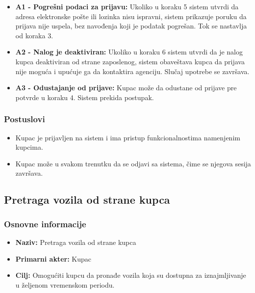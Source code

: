 \documentclass[a4paper,12pt]{article}
\begin{document}
\begin{itemize}
    \item \textbf{A1 - Pogrešni podaci za prijavu:}
    Ukoliko u koraku 5 sistem utvrdi da adresa elektronske pošte ili lozinka nisu ispravni, sistem prikazuje poruku da prijava nije uspela, bez navođenja koji je podatak pogrešan. Tok se nastavlja od koraka 3.

    \item \textbf{A2 - Nalog je deaktiviran:}
    Ukoliko u koraku 6 sistem utvrdi da je nalog kupca deaktiviran od strane zaposlenog, sistem obaveštava kupca da prijava nije moguća i upućuje ga da kontaktira agenciju. Slučaj upotrebe se završava.

    \item \textbf{A3 - Odustajanje od prijave:}
    Kupac može da odustane od prijave pre potvrde u koraku 4. Sistem prekida postupak.
\end{itemize}

\subsubsection{Postuslovi}

\begin{itemize}
    \item Kupac je prijavljen na sistem i ima pristup funkcionalnostima namenjenim kupcima.
    \item Kupac može u svakom trenutku da se odjavi sa sistema, čime se njegova sesija završava.
\end{itemize}

\newpage

\subsection{Pretraga vozila od strane kupca}

\subsubsection{Osnovne informacije}

\begin{itemize}
    \item \textbf{Naziv:} Pretraga vozila od strane kupca
    \item \textbf{Primarni akter:} Kupac
    \item \textbf{Cilj:} Omogućiti kupcu da pronađe vozila koja su dostupna za iznajmljivanje u željenom vremenskom periodu.
\end{itemize}
\end{document}
